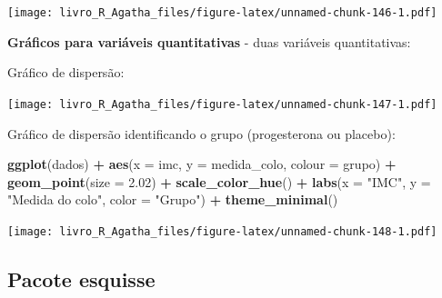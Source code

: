 \documentclass[
]{book}
\newenvironment{Shaded}{\begin{snugshade}}{\end{snugshade}}
\newcommand{\DataTypeTok}[1]{\textcolor[rgb]{0.13,0.29,0.53}{#1}}
\newcommand{\FloatTok}[1]{\textcolor[rgb]{0.00,0.00,0.81}{#1}}
\newcommand{\KeywordTok}[1]{\textcolor[rgb]{0.13,0.29,0.53}{\textbf{#1}}}
\newcommand{\NormalTok}[1]{#1}
\newcommand{\OperatorTok}[1]{\textcolor[rgb]{0.81,0.36,0.00}{\textbf{#1}}}
\newcommand{\StringTok}[1]{\textcolor[rgb]{0.31,0.60,0.02}{#1}}
\begin{document}
\texttt{[image: livro\_R\_Agatha\_files/figure-latex/unnamed-chunk-146-1.pdf]}

\textbf{Gráficos para variáveis quantitativas} - duas variáveis quantitativas:

Gráfico de dispersão:

\begin{Shaded}
\end{Shaded}

\texttt{[image: livro\_R\_Agatha\_files/figure-latex/unnamed-chunk-147-1.pdf]}

Gráfico de dispersão identificando o grupo (progesterona ou placebo):

\begin{Shaded}
\begin{Highlighting}[]
\KeywordTok{ggplot}\NormalTok{(dados) }\OperatorTok{+}
\StringTok{  }\KeywordTok{aes}\NormalTok{(}\DataTypeTok{x =}\NormalTok{ imc, }\DataTypeTok{y =}\NormalTok{ medida_colo, }\DataTypeTok{colour =}\NormalTok{ grupo) }\OperatorTok{+}
\StringTok{  }\KeywordTok{geom_point}\NormalTok{(}\DataTypeTok{size =} \FloatTok{2.02}\NormalTok{) }\OperatorTok{+}
\StringTok{  }\KeywordTok{scale_color_hue}\NormalTok{() }\OperatorTok{+}
\StringTok{  }\KeywordTok{labs}\NormalTok{(}\DataTypeTok{x =} \StringTok{"IMC"}\NormalTok{, }\DataTypeTok{y =} \StringTok{"Medida do colo"}\NormalTok{, }\DataTypeTok{color =} \StringTok{"Grupo"}\NormalTok{) }\OperatorTok{+}
\StringTok{  }\KeywordTok{theme_minimal}\NormalTok{()}
\end{Highlighting}
\end{Shaded}

\texttt{[image: livro\_R\_Agatha\_files/figure-latex/unnamed-chunk-148-1.pdf]}

\hypertarget{pacote-esquisse}{%
\subsection{Pacote esquisse}\label{pacote-esquisse}}
\end{document}
